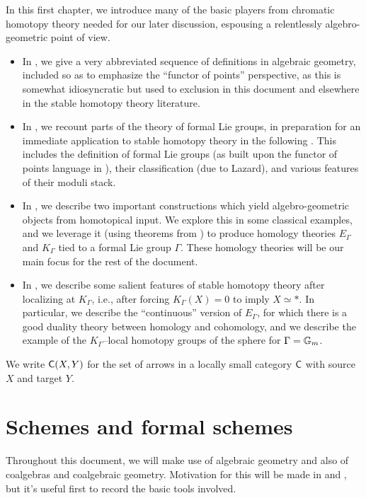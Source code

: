 In this first chapter, we introduce many of the basic players from chromatic homotopy theory needed for our later discussion, espousing a relentlessly algebro-geometric point of view.
\begin{itemize}
\item In , we give a very abbreviated sequence of definitions in algebraic geometry, included so as to emphasize the ``functor of points'' perspective, as this is somewhat idiosyncratic but used to exclusion in this document and elsewhere in the stable homotopy theory literature.
\item In , we recount parts of the theory of formal Lie groups, in preparation for an immediate application to stable homotopy theory in the following .  This includes the definition of formal Lie groups (as built upon the functor of points language in ), their classification (due to Lazard), and various features of their moduli stack.
\item In , we describe two important constructions which yield algebro-geometric objects from homotopical input.  We explore this in some classical examples, and we leverage it (using theorems from ) to produce homology theories $E_\Gamma$ and $K_\Gamma$ tied to a formal Lie group $\Gamma$.  These homology theories will be our main focus for the rest of the document.
\item In , we describe some salient features of stable homotopy theory after localizing at $K_\Gamma$, i.e., after forcing $K_\Gamma(X) = 0$ to imply $X \simeq *$.  In particular, we describe the ``continuous'' version of $E_\Gamma$, for which there is a good duality theory between homology and cohomology, and we describe the example of the $K_\Gamma$--local homotopy groups of the sphere for $\Gamma = \mathbb G_m$.
\end{itemize}

\noindent We write $\mathsf{C}(X, Y)$ for the set of arrows in a locally small category $\mathsf{C}$ with source $X$ and target $Y$.

\section{Schemes and formal schemes}\label{SchemesAndFormalSchemes}

Throughout this document, we will make use of algebraic geometry and also of coalgebras and coalgebraic geometry.  Motivation for this will be made in  and , but it's useful first to record the basic tools involved.

